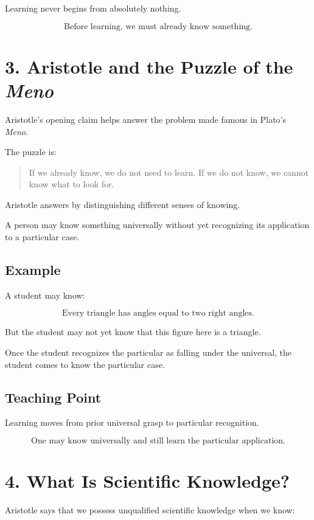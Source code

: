 \documentclass[12pt]{article}
\begin{document}
Learning never begins from absolutely nothing.

\[
\boxed{
\text{Before learning, we must already know something.}
}
\]

\section*{3. Aristotle and the Puzzle of the \textit{Meno}}

Aristotle's opening claim helps answer the problem made famous in Plato's
\textit{Meno}.

The puzzle is:

\begin{quote}
If we already know, we do not need to learn. If we do not know, we cannot know
what to look for.
\end{quote}

Aristotle answers by distinguishing different senses of knowing.

A person may know something universally without yet recognizing its application
to a particular case.

\subsection*{Example}

A student may know:

\[
\text{Every triangle has angles equal to two right angles.}
\]

But the student may not yet know that this figure here is a triangle.

Once the student recognizes the particular as falling under the universal, the
student comes to know the particular case.

\subsection*{Teaching Point}

Learning moves from prior universal grasp to particular recognition.

\[
\boxed{
\text{One may know universally and still learn the particular application.}
}
\]

\section*{4. What Is Scientific Knowledge?}

Aristotle says that we possess unqualified scientific knowledge when we know:
\end{document}
